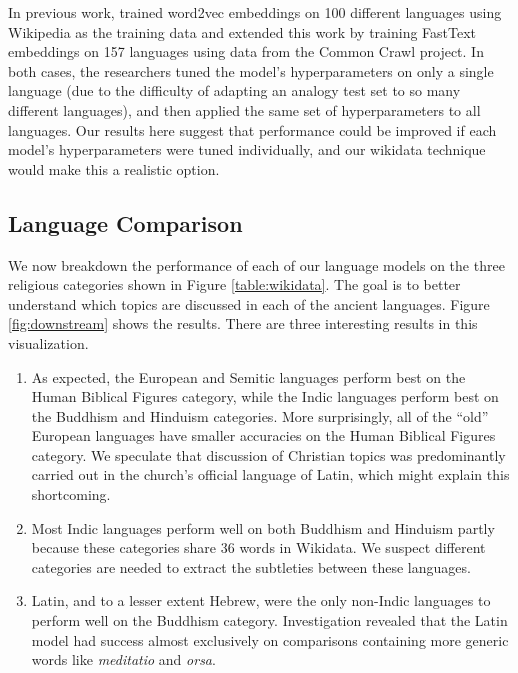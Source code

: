 \documentclass[11pt,a4paper]{article}
\begin{document}
In previous work, 
\citet{al2013polyglot} trained word2vec embeddings on 100 different languages using Wikipedia as the training data and 
\citet{grave2018learning} extended this work by training FastText embeddings on 157 languages using data from the Common Crawl project.
In both cases, the researchers tuned the model's hyperparameters on only a single language (due to the difficulty of adapting an analogy test set to so many different languages),
and then applied the same set of hyperparameters to all languages.
Our results here suggest that performance could be improved if each model's hyperparameters were tuned individually,
and our wikidata technique would make this a realistic option.


\subsection{Language Comparison}


We now breakdown the performance of each of our language models on the three religious categories shown in Figure \ref{table:wikidata}.
The goal is to better understand which topics are discussed in each of the ancient languages.
Figure \ref{fig:downstream} shows the results.
There are three interesting results in this visualization.
\begin{enumerate}
\item
As expected, the European and Semitic languages perform best on the Human Biblical Figures category,
while the Indic languages perform best on the Buddhism and Hinduism categories.
More surprisingly, all of the ``old'' European languages have smaller accuracies on the Human Biblical Figures category.
We speculate that discussion of Christian topics was predominantly carried out in the church's official language of Latin,
which might explain this shortcoming.
\item

Most Indic languages perform well on both Buddhism and Hinduism 
partly because these categories share 36 words in Wikidata.
We suspect different categories are needed to extract the subtleties between these languages.
\item

Latin, and to a lesser extent Hebrew, were the only non-Indic languages to perform well on the Buddhism category.
Investigation revealed that the Latin model had success almost exclusively on comparisons containing more generic words like \emph{meditatio} and \emph{orsa}. 
\end{enumerate}
\end{document}
